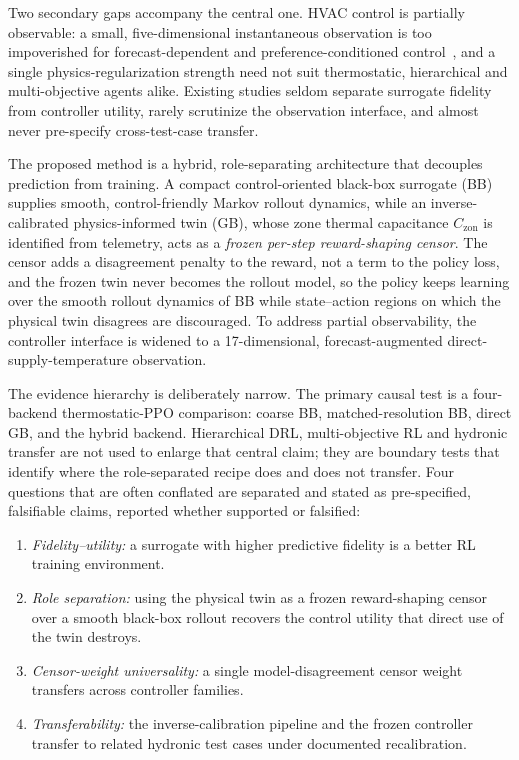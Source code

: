 \documentclass[5p]{elsarticle}
\newcommand{\Czon}{\ensuremath{C_{\mathrm{zon}}}}
\begin{document}
Two secondary gaps accompany the central one. HVAC control is partially observable: a small,
five-dimensional instantaneous observation is too impoverished for forecast-dependent and
preference-conditioned control~\cite{Gao2024Predictive,Byeon2025MaxMinMORL}, and a single
physics-regularization strength need not suit thermostatic, hierarchical and multi-objective agents
alike. Existing studies seldom separate surrogate fidelity from controller utility, rarely
scrutinize the observation interface, and almost never pre-specify cross-test-case transfer.

The proposed method is a hybrid, role-separating architecture that decouples prediction from
training. A compact control-oriented black-box surrogate (BB) supplies smooth, control-friendly
Markov rollout dynamics, while an inverse-calibrated physics-informed twin (GB), whose zone thermal
capacitance \Czon{} is identified from telemetry, acts as a \emph{frozen per-step reward-shaping
censor}. The censor adds a disagreement penalty to the reward, not a term to the policy loss, and
the frozen twin never becomes the rollout model, so the policy keeps learning over the smooth
rollout dynamics of BB while state--action regions on which the physical twin disagrees are
discouraged. To address partial observability, the controller interface is widened to a
17-dimensional, forecast-augmented direct-supply-temperature observation.

The evidence hierarchy is deliberately narrow. The primary causal test is a four-backend
thermostatic-PPO comparison: coarse BB, matched-resolution BB, direct GB, and the hybrid backend.
Hierarchical DRL, multi-objective RL and hydronic transfer are not used to enlarge that central
claim; they are boundary tests that identify where the role-separated recipe does and does not
transfer. Four questions that are often conflated are separated and stated as pre-specified,
falsifiable claims, reported whether supported or falsified:

\begin{enumerate}[label=\textbf{H\arabic*.},leftmargin=2.6em,itemsep=1pt,topsep=2pt]
\item \emph{Fidelity--utility:} a surrogate with higher predictive fidelity is a better RL training
environment.
\item \emph{Role separation:} using the physical twin as a frozen reward-shaping censor over a
smooth black-box rollout recovers the control utility that direct use of the twin destroys.
\item \emph{Censor-weight universality:} a single model-disagreement censor weight transfers across
controller families.
\item \emph{Transferability:} the inverse-calibration pipeline and the frozen controller transfer to
related hydronic test cases under documented recalibration.
\end{enumerate}
\end{document}
